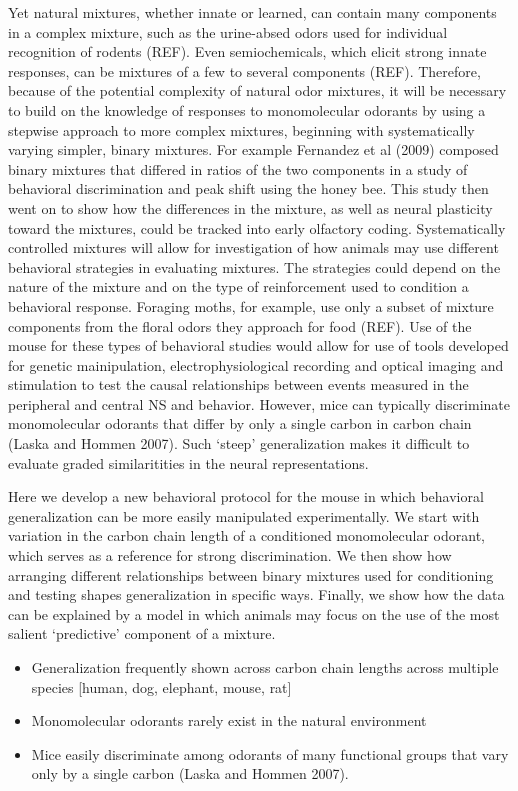  Yet natural mixtures, whether innate or learned, can contain many components in a complex mixture, such as the urine-absed odors used for individual recognition of rodents (REF). 
 Even semiochemicals, which elicit strong innate responses,  can be mixtures of a few to several components (REF). 
 Therefore, because of the potential complexity of natural odor mixtures, it will be necessary to build on the knowledge of responses to monomolecular odorants by using a stepwise approach to more complex mixtures, beginning with systematically varying simpler, binary mixtures. 
 For example Fernandez et al (2009) composed binary mixtures that differed in ratios of the two components in a study of behavioral discrimination and peak shift using the honey bee. 
 This study then went on to show how the differences in the mixture, as well as neural plasticity toward the mixtures, could be tracked into early olfactory coding. 
Systematically controlled mixtures will allow for investigation of how animals may use different behavioral strategies in evaluating mixtures. 
The strategies could depend on the nature of the mixture and on the type of reinforcement used to condition a behavioral response. 
Foraging moths, for example, use only a subset of mixture components from the floral odors they approach for food (REF). Use of the mouse for these types of behavioral studies would allow for use of tools developed for genetic mainipulation, electrophysiological recording and optical imaging and stimulation to test the causal relationships between events measured in the peripheral and central NS and behavior. 
However, mice can typically discriminate monomolecular odorants that differ by only a single carbon in carbon chain (Laska and Hommen 2007). 
Such ‘steep’ generalization makes it difficult to evaluate graded similaritities in the neural representations. 

Here  we develop a new behavioral protocol for the mouse in which behavioral generalization can be more easily manipulated experimentally. 
We start with variation in the carbon chain length of a conditioned monomolecular odorant, which serves as a reference for strong discrimination. 
We then show how arranging different relationships between binary mixtures used for conditioning and testing shapes generalization in specific ways. 
Finally, we show how the data can be explained by a model in which animals may focus on the use of the most salient ‘predictive’ component of a mixture. 

\begin{itemize}
\item Generalization frequently shown across carbon chain lengths across multiple species [human, dog, elephant, mouse, rat]
\item Monomolecular odorants rarely exist in the natural environment
\item Mice easily discriminate among odorants of many functional groups that vary only by a single carbon (Laska and Hommen 2007).
\end{itemize}
